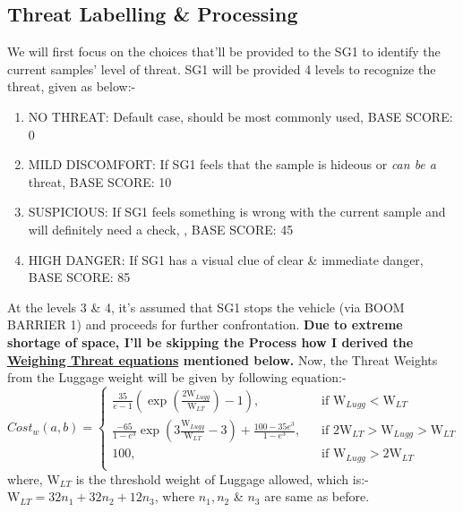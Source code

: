 \documentclass[a4paper,11pt]{article}
\begin{document}
\subsection{Threat Labelling \& Processing}
We will first focus on the choices that'll be provided to the SG1 to identify the current samples' level of threat. SG1 will be provided 4 levels to recognize the threat, given as below:-
\begin{enumerate}
\item{NO THREAT: Default case, should be most commonly used, BASE SCORE: 0}
\item{MILD DISCOMFORT: If SG1 feels that the sample is hideous or \textit{can be a} threat, BASE SCORE: 10}
\item{SUSPICIOUS: If SG1 feels something is wrong with the current sample and will definitely need a check, , BASE SCORE: 45}
\item{HIGH DANGER: If SG1 has a visual clue of clear \& immediate danger, BASE SCORE: 85}
\end{enumerate}
At the levels 3 \& 4, it's assumed that SG1 stops the vehicle (via BOOM BARRIER 1) and proceeds for further confrontation.\newline
\textbf{Due to extreme shortage of space, I'll be skipping the Process how I derived the \underline{Weighing Threat equations} mentioned below.}
\newline\newline
Now, the Threat Weights from the Luggage weight will be given by following equation:-\newline\newline
\[   
Cost_w(a,b) = 
     \begin{cases}
       \text{$\frac{35}{e - 1}(\exp(\frac{2\text{W}_{Lugg}}{\text{W}_{LT}}) - 1)$,}&\quad\text{if $\text{W}_{Lugg} < \text{W}_{LT}$}\\
       \text{$\frac{-65}{1-e^3}\exp(3\frac{\text{W}_{Lugg}}{\text{W}_{LT}} - 3) + \frac{100 - 35e^3}{1-e^3}$,} &\quad\text{if $2\text{W}_{LT} > \text{W}_{Lugg} > \text{W}_{LT}$}\\
       \text{100,} &\quad\text{if $\text{W}_{Lugg} > 2\text{W}_{LT}$}\\
     \end{cases}
\]
where, $\text{W}_{LT}$ is the threshold weight of Luggage allowed, which is:-\newline
$\text{W}_{LT} = 32n_1 + 32n_2 + 12n_3$, where $n_1, n_2$ \& $n_3$ are same as before.
\newpage
\end{document}
